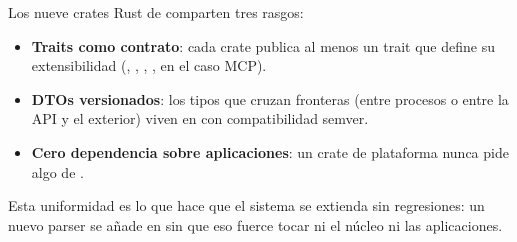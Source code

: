 Los nueve crates Rust de  comparten tres
rasgos:

\begin{itemize}
    \item \textbf{Traits como contrato}: cada crate publica al menos
    un trait que define su extensibilidad (,
    , , ,
     en el caso MCP).
    \item \textbf{DTOs versionados}: los tipos que cruzan fronteras
    (entre procesos o entre la API y el exterior) viven en
     con compatibilidad semver.
    \item \textbf{Cero dependencia sobre aplicaciones}: un crate de
    plataforma nunca pide algo de .
\end{itemize}

Esta uniformidad es lo que hace que el sistema se extienda sin
regresiones: un nuevo parser se añade en 
sin que eso fuerce tocar ni el núcleo ni las aplicaciones.
